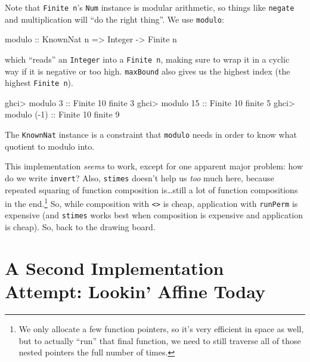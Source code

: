 \documentclass[]{article}
\newenvironment{Shaded}{}{}
\newcommand{\DataTypeTok}[1]{\textcolor[rgb]{0.56,0.13,0.00}{#1}}
\newcommand{\DecValTok}[1]{\textcolor[rgb]{0.25,0.63,0.44}{#1}}
\newcommand{\NormalTok}[1]{#1}
\newcommand{\OperatorTok}[1]{\textcolor[rgb]{0.40,0.40,0.40}{#1}}
\newcommand{\OtherTok}[1]{\textcolor[rgb]{0.00,0.44,0.13}{#1}}
\begin{document}
Note that \texttt{Finite\ n}'s \texttt{Num} instance is modular arithmetic, so
things like \texttt{negate} and multiplication will ``do the right thing''. We
use \texttt{modulo}:

\begin{Shaded}
\begin{Highlighting}[]
\OtherTok{modulo ::} \DataTypeTok{KnownNat}\NormalTok{ n }\OtherTok{=>} \DataTypeTok{Integer} \OtherTok{{-}>} \DataTypeTok{Finite}\NormalTok{ n}
\end{Highlighting}
\end{Shaded}

which ``reads'' an \texttt{Integer} into a \texttt{Finite\ n}, making sure to
wrap it in a cyclic way if it is negative or too high. \texttt{maxBound} also
gives us the highest index (the highest \texttt{Finite\ n}).

\begin{Shaded}
\begin{Highlighting}[]
\NormalTok{ghci}\OperatorTok{>}\NormalTok{ modulo }\DecValTok{3}\OtherTok{ ::} \DataTypeTok{Finite} \DecValTok{10}
\NormalTok{finite }\DecValTok{3}
\NormalTok{ghci}\OperatorTok{>}\NormalTok{ modulo }\DecValTok{15}\OtherTok{ ::} \DataTypeTok{Finite} \DecValTok{10}
\NormalTok{finite }\DecValTok{5}
\NormalTok{ghci}\OperatorTok{>}\NormalTok{ modulo (}\OperatorTok{{-}}\DecValTok{1}\NormalTok{)}\OtherTok{ ::} \DataTypeTok{Finite} \DecValTok{10}
\NormalTok{finite }\DecValTok{9}
\end{Highlighting}
\end{Shaded}

The \texttt{KnownNat} instance is a constraint that \texttt{modulo} needs in
order to know what quotient to modulo into.

This implementation \emph{seems} to work, except for one apparent major problem:
how do we write \texttt{invert}? Also, \texttt{stimes} doesn't help us
\emph{too} much here, because repeated squaring of function composition
is\ldots still a lot of function compositions in the end.\footnote{We only
  allocate a few function pointers, so it's very efficient in space as well, but
  to actually ``run'' that final function, we need to still traverse all of
  those nested pointers the full number of times.} So, while composition with
\texttt{\textless{}\textgreater{}} is cheap, application with \texttt{runPerm}
is expensive (and \texttt{stimes} works best when composition is expensive and
application is cheap). So, back to the drawing board.

\hypertarget{a-second-implementation-attempt-lookin-affine-today}{%
\section{A Second Implementation Attempt: Lookin' Affine
Today}\label{a-second-implementation-attempt-lookin-affine-today}}
\end{document}

